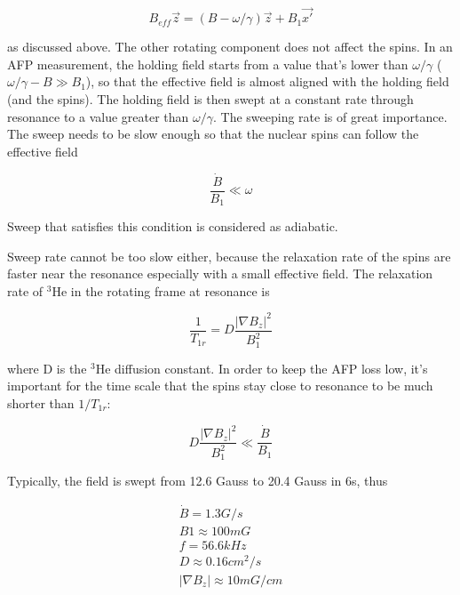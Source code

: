 \begin{equation}
B_{eff}\vec{z}=(B-\omega/\gamma)\vec{z} + B_{1}\vec{x'}
\end{equation}

as discussed above. The other rotating component does not affect the spins. In an AFP measurement, the holding field starts from a value that's lower than $\omega/\gamma$ ($\omega/\gamma-B\gg B_{1}$), so that the effective field is almost aligned with the holding field (and the spins). The holding field is then swept at a constant rate through resonance to a value greater than $\omega/\gamma$. The sweeping rate is of great importance. The sweep needs to be slow enough so that the nuclear spins can follow the effective field

\begin{equation}
\frac{\dot B}{B_{1}}\ll \omega
\end{equation}

Sweep that satisfies this condition is considered as adiabatic.

Sweep rate cannot be too slow either, because the relaxation rate of the spins are faster near the resonance especially with a small effective field. The relaxation rate of $^{3}$He in the rotating frame at resonance is 

\begin{equation}
\frac{1}{T_{1r}}=D\frac{|\nabla B_{z}|^{2}}{B_{1}^{2}} 
\end{equation}

where D is the $^{3}$He diffusion constant. In order to keep the AFP loss low, it's important for the time scale that the spins stay close to resonance to be much shorter than $1/T_{1r}$:

\begin{equation}
D\frac{|\nabla B_{z}|^{2}}{B_{1}^{2}} \ll \frac{\dot B}{B_{1}}
\end{equation}

Typically, the field is swept from 12.6 Gauss to 20.4 Gauss in 6s, thus

\begin{subequations}
	\begin{gather}
	\dot B = 1.3G/s\\
	B1 \approx 100mG\\
	f = 56.6kHz\\
	D \approx 0.16cm^2/s\\
	|\nabla B_{z}| \approx 10mG/cm\\
	\end{gather}
\end{subequations}

